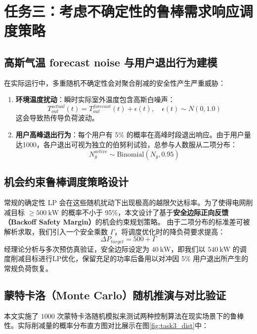 \documentclass[12pt,a4paper]{article}
\begin{document}
\section{任务三：考虑不确定性的鲁棒需求响应调度策略}
\subsection{高斯气温 forecast noise 与用户退出行为建模}
在实际运行中，多重随机不确定性会对聚合削减的安全性产生严重威胁：
\begin{enumerate}
    \item \textbf{环境温度扰动}：瞬时实际室外温度包含高斯白噪声：
    \begin{equation}
        T_{out}^{actual}(t) = T_{out}^{forecast}(t) + \epsilon(t), \quad \epsilon(t) \sim N(0, 1.0)
    \end{equation}
    这会导致热传导负荷波动。
    \item \textbf{用户高峰退出行为}：每个用户有 5\% 的概率在高峰时段退出响应。由于用户量达1000，各户退出可视为独立的伯努利试验，总参与人数服从二项分布：
    \begin{equation}
        N_g^{active} \sim \text{Binomial}(N_g, 0.95)
    \end{equation}
\end{enumerate}

\subsection{机会约束鲁棒调度策略设计}
常规的确定性 LP 会在这些随机扰动下出现极高的越限欠达标率。为了使得电网削减目标 $\ge 500\ \text{kW}$ 的概率不小于 95\%，本文设计了基于\textbf{安全边际正向反馈（Backoff Safety Margin）}的机会约束规划策略。
由于二项分布的标准差可被解析求取，我们引入一个安全乘数 $\Gamma$，将调度优化时的降负荷要求提高：
\begin{equation}
    \Delta P_{target} = 500 + \Gamma
\end{equation}
经理论分析与多次预仿真验证，安全边际设定为 $40\ \text{kW}$，即我们以 $540\ \text{kW}$ 的调度削减目标进行LP优化，保留充足的功率后备用以对冲因 5\% 用户退出所产生的常规负荷恢复。

\subsection{蒙特卡洛（Monte Carlo）随机推演与对比验证}
本文实施了 $1000$ 次蒙特卡洛随机模拟来测试两种控制算法在现实场景下的鲁棒性。实际削减量的概率分布直方图对比展示在图\ref{fig:task3_dist}中：
\end{document}
